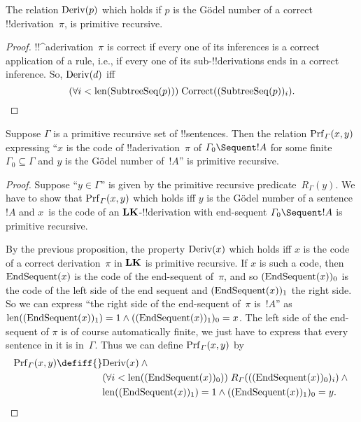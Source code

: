 \documentclass[../../../include/open-logic-section]{subfiles}
\begin{document}
\begin{prop}
  The relation $\mathrm{Deriv}(p)$ which holds if $p$ is the G\"odel
  number of a correct !!{derivation}~$\pi$, is primitive recursive.
\end{prop}

\begin{proof}
  !!^a{derivation}~$\pi$ is correct if every one of its inferences
  is a correct application of a rule, i.e., if every one of its
  sub-!!{derivation}s ends in a correct inference. So, $\mathrm{Deriv}(d)$
  iff
  \[
  (\forall i<\mathrm{len}(\mathrm{SubtreeSeq}(p)))\; \mathrm{Correct}((\mathrm{SubtreeSeq}(p))_i).
  \qedhere
  \]
\end{proof}


\begin{prop}
Suppose $\Gamma$ is a primitive recursive set of !!{sentence}s.  Then
the relation $\Prf[\Gamma](x, y)$ expressing ``$x$ is the code of
!!a{derivation}~$\pi$ of $\Gamma_0 \Sequent !A$ for some finite
$\Gamma_0 \subseteq \Gamma$ and $y$ is the G\"odel number of~$!A$'' is
primitive recursive.
\end{prop}

\begin{proof}
Suppose ``$y \in \Gamma$'' is given by the primitive recursive
predicate~$R_\Gamma(y)$.  We have to show that $\Prf[\Gamma](x, y)$
which holds iff $y$ is the G\"odel number of a sentence~$!A$ and
$x$~is the code of an $\mathbf{LK}$-!!{derivation} with end-sequent
$\Gamma_0 \Sequent !A$ is primitive recursive.

By the previous proposition, the property $\mathrm{Deriv}(x)$ which holds
iff $x$ is the code of a correct derivation~$\pi$ in $\mathbf{LK}$ is
primitive recursive.  If $x$ is such a code, then $\mathrm{EndSequent}(x)$
is the code of the end-sequent of~$\pi$, and so
$(\mathrm{EndSequent}(x))_0$ is the code of the left side of the end
sequent and $(\mathrm{EndSequent}(x))_1$ the right side.  So we can
express ``the right side of the end-sequent of~$\pi$ is~$!A$'' as
$\mathrm{len}((\mathrm{EndSequent}(x))_1) = 1 \land ((\mathrm{EndSequent}(x))_1)_0 =
x$.  The left side of the end-sequent of $\pi$ is of course
automatically finite, we just have to express that every sentence in
it is in~$\Gamma$.  Thus we can define $\Prf[\Gamma](x, y)$ by
\begin{align*}
\Prf[\Gamma](x, y) \defiff {}&
\fn{Deriv}(x) \land {} \\
& \bforall{i <
  \len{(\fn{EndSequent}(x))_0}}{R_\Gamma(((\fn{EndSequent}(x))_0)_i)} \land {}\\
& \len{(\fn{EndSequent}(x))_1} = 1 \land ((\fn{EndSequent}(x))_1)_0 = y.\qedhere
\end{align*}
\end{proof}
\end{document}
